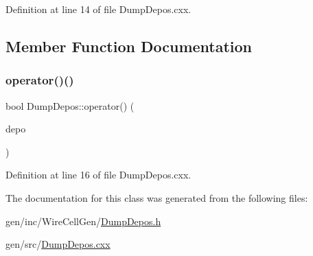 Definition at line 14 of file Dump\+Depos.\+cxx.



\subsection{Member Function Documentation}
\mbox{\label{class_wire_cell_1_1_dump_depos_a7e95cd8fef954d898fac763ba7e40b14}} 
\subsubsection{\texorpdfstring{operator()()}{operator()()}}
{\footnotesize\ttfamily bool Dump\+Depos\+::operator() (\begin{DoxyParamCaption}\item[{const \hyperlink{class_wire_cell_1_1_i_data_aff870b3ae8333cf9265941eef62498bc}{I\+Depo\+::pointer} \&}]{depo }\end{DoxyParamCaption})\hspace{0.3cm}{\ttfamily [virtual]}}



Definition at line 16 of file Dump\+Depos.\+cxx.



The documentation for this class was generated from the following files\+:\begin{DoxyCompactItemize}
\item 
gen/inc/\+Wire\+Cell\+Gen/\hyperlink{_dump_depos_8h}{Dump\+Depos.\+h}\item 
gen/src/\hyperlink{_dump_depos_8cxx}{Dump\+Depos.\+cxx}\end{DoxyCompactItemize}
